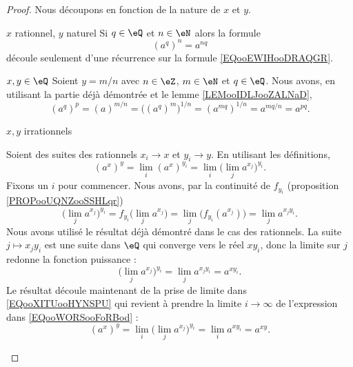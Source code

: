 \begin{proof}
    Nous découpons en fonction de la nature de \( x\) et \( y\). 

    \begin{subproof}
        \item[\( x\) rationnel, \( y\) naturel]
            Si \( q\in \eQ\) et \( n\in \eN\) alors la formule
            \begin{equation}
                (a^q)^n=a^{nq}
            \end{equation}
            découle seulement d'une récurrence sur la formule \ref{EQooEWIHooDRAQGR}.

        \item[ \( x,y\in \eQ\)]
            Soient \( y=m/n\) avec \( n\in \eZ\), \( m\in \eN\) et \( q\in \eQ\). Nous avons, en utilisant la partie déjà démontrée et le lemme \ref{LEMooIDLJooZALNaD},
            \begin{equation}
                (a^q)^{p}=(a)^{m/n}=\big( (a^q)^m \big)^{1/n}=(a^{mq})^{1/n}=a^{mq/n}=a^{pq}.
            \end{equation}
        \item[\( x,y\) irrationnels]

            Soient des suites des rationnels \( x_i\to x\) et \( y_i\to y\). En utilisant les définitions,
            \begin{equation}        \label{EQooXITUooHYNSPU}
                (a^x)^y=\lim_i(a^x)^{y_i}=\lim_i\big( \lim_j a^{x_j} \big)^{y_i}.
            \end{equation}
            Fixons un \(i\) pour commencer. Nous avons, par la continuité de \( f_{y_i}\) (proposition \ref{PROPooUQNZooSSHLqr})
            \begin{equation}
                \big( \lim_ja^{x_j} \big)^{y_i}=f_{y_i}\big( \lim_ja^{x_j} \big)=\lim_j\big( f_{y_i}(a^{x_j}) \big)=\lim_ja^{x_jy_i}.
            \end{equation}
            Nous avons utilisé le résultat déjà démontré dans le cas des rationnels. La suite \( j\mapsto x_jy_i\) est une suite dans \( \eQ\) qui converge vers le réel \( xy_i\), donc la limite sur \( j\) redonne la fonction puissance :
            \begin{equation}        \label{EQooWORSooFoRBod}
                \big( \lim_ja^{x_j} \big)^{y_i}=\lim_ja^{x_jy_i}=a^{xy_i}.
            \end{equation}
            Le résultat découle maintenant de la prise de limite dans \eqref{EQooXITUooHYNSPU} qui revient à prendre la limite \( i\to \infty\) de l'expression dans \eqref{EQooWORSooFoRBod} :
            \begin{equation}
                (a^x)^y=\lim_i\big( \lim_j a^{x_j} \big)^{y_i}=\lim_ia^{xy_i}=a^{xy}.
            \end{equation}
    \end{subproof}
\end{proof}

